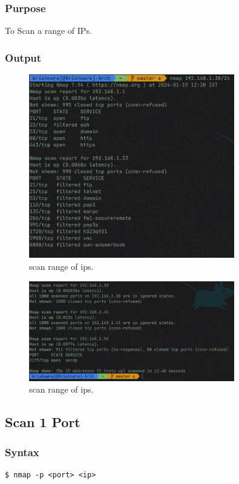 \documentclass[11pt]{article}
\begin{document}
\subsubsection*{Purpose}
To Scan a range of IPs.

\subsubsection*{Output}
\begin{figure}[H]
    \centering
    \includegraphics[width=0.8\textwidth]{scan ip range 1.png}
    \caption{scan range of ips. }
    \label{fig:1}
\end{figure}
\begin{figure}[H]
    \centering
    \includegraphics[width=0.8\textwidth]{scan ip range 2.png}
    \caption{scan range of ips. }
    \label{fig:1}
\end{figure}

\subsection{Scan 1 Port}

\subsubsection{Syntax}
\begin{verbatim}
$ nmap -p <port> <ip>
\end{verbatim}
\end{document}
